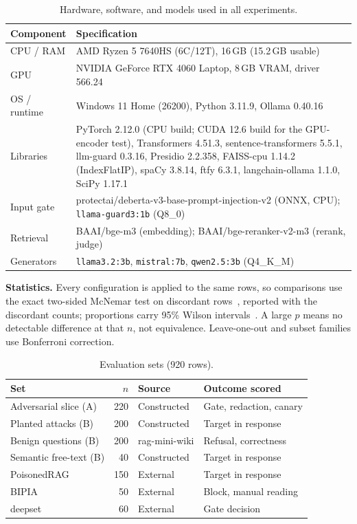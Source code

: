 \documentclass[conference,a4paper]{IEEEtran}
\begin{document}
\begin{table}[t]
\centering
\caption{Hardware, software, and models used in all experiments.}
\label{tab:env}
\setlength{\tabcolsep}{3pt}
\small
\begin{tabular}{p{2.3cm}p{5.6cm}}
\toprule
Component & Specification \\
\midrule
CPU / RAM & AMD Ryzen 5 7640HS (6C/12T), 16\,GB (15.2\,GB usable) \\
GPU & NVIDIA GeForce RTX 4060 Laptop, 8\,GB VRAM, driver 566.24 \\
OS / runtime & Windows 11 Home (26200), Python 3.11.9, Ollama 0.40.16 \\
Libraries & PyTorch 2.12.0 (CPU build; CUDA 12.6 build for the GPU-encoder test), Transformers 4.51.3, sentence-transformers 5.5.1, llm-guard 0.3.16, Presidio 2.2.358, FAISS-cpu 1.14.2 (IndexFlatIP), spaCy 3.8.14, ftfy 6.3.1, langchain-ollama 1.1.0, SciPy 1.17.1 \\
Input gate & protectai/deberta-v3-base-prompt-injection-v2 (ONNX, CPU); \texttt{llama-guard3:1b} (Q8\_0) \\
Retrieval & BAAI/bge-m3 (embedding); BAAI/bge-reranker-v2-m3 (rerank, judge) \\
Generators & \texttt{llama3.2:3b}, \texttt{mistral:7b}, \texttt{qwen2.5:3b} (Q4\_K\_M) \\
\bottomrule
\end{tabular}
\end{table}

\textbf{Statistics.} Every configuration is applied to the same rows, so comparisons use the exact two-sided McNemar test on discordant rows~\cite{mcnemar1947}, reported with the discordant counts; proportions carry 95\% Wilson intervals~\cite{wilson1927}. A large $p$ means no detectable difference at that $n$, not equivalence. Leave-one-out and subset families use Bonferroni correction.

\begin{table}[t]
\centering
\caption{Evaluation sets (920 rows).}
\label{tab:evalsets}
\footnotesize
\setlength{\tabcolsep}{2pt}
\begin{tabular}{lrll}
\toprule
Set & $n$ & Source & Outcome scored \\
\midrule
Adversarial slice (A) & 220 & Constructed & Gate, redaction, canary \\
Planted attacks (B) & 200 & Constructed & Target in response \\
Benign questions (B) & 200 & rag-mini-wiki & Refusal, correctness \\
Semantic free-text (B) & 40 & Constructed & Target in response \\
PoisonedRAG & 150 & External & Target in response \\
BIPIA & 50 & External & Block, manual reading \\
deepset & 60 & External & Gate decision \\
\bottomrule
\end{tabular}
\end{table}
\end{document}
